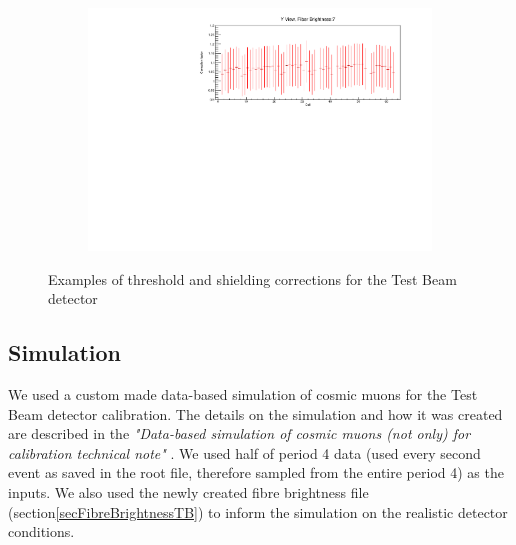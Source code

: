 \documentclass[12pt,a4paper]{article}
\begin{document}
\begin{figure}[hbtp]
\begin{subfigure}[t]{0.9\textwidth}
\includegraphics[width=\textwidth]{Plots/ThresholdCorrectionExample_cyview_fb7_P4DataBasedSim.pdf}
\end{subfigure}
\caption{Examples of threshold and shielding corrections for the Test Beam detector}
\label{figTBThresholdCorrections}
\end{figure}

\subsection{Simulation}\label{secSimulationResults}



We used a custom made data-based simulation of cosmic muons for the Test Beam detector calibration. The details on the simulation and how it was created are described in the \textit{"Data-based simulation of cosmic muons (not only) for calibration technical note"} \cite{NOVA-doc-60026}. We used half of period 4 data (used every second event as saved in the root file, therefore sampled from the entire period 4) as the inputs. We also used the newly created fibre brightness file (section\ref{secFibreBrightnessTB}) to inform the simulation on the realistic detector conditions.
\end{document}
